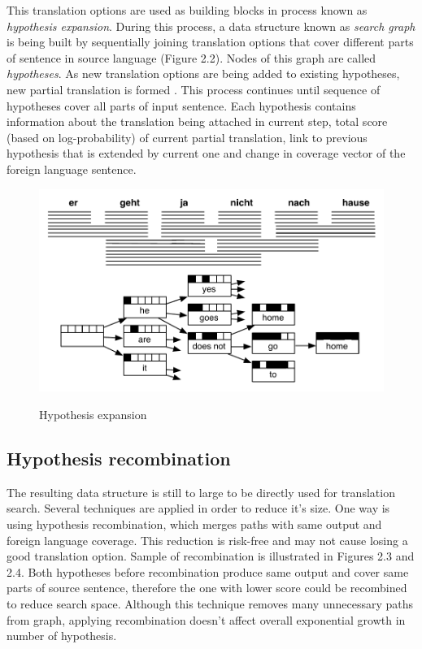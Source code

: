This translation options are used as building blocks in process known as \textit{hypothesis expansion}. During this process, a data structure known as \textit{search graph} is being built by sequentially joining translation options that cover different parts of sentence in source language (Figure 2.2). Nodes of this graph are called \textit{hypotheses}. As new translation options are being added to existing hypotheses, new partial translation is formed \cite{Koehn2009a}. This process continues until sequence of hypotheses cover all parts of input sentence. Each hypothesis contains information about the translation being attached in current step, total score (based on log-probability) of current partial translation, link to previous hypothesis that is extended by current one and change in coverage vector of the foreign language sentence.


\begin{figure}
 \centering 
 \includegraphics{g/decoding-step5.pdf}
 \caption{Hypothesis expansion}
 \caption*{\textit{\cite{Koehn2009a}}}
\end{figure}

\subsection{Hypothesis recombination}

The resulting data structure is still to large to be directly used for translation search. Several techniques are applied in order to reduce it's size. One way is using hypothesis recombination, which merges paths with same output and foreign language coverage. This reduction is risk-free and may not cause losing a good translation option. Sample of recombination is illustrated in Figures 2.3 and 2.4. Both hypotheses before recombination produce same output and cover same parts of source sentence, therefore the one with lower score could be recombined to reduce search space. Although this technique removes many unnecessary paths from graph, applying recombination doesn't affect overall exponential growth in number of hypothesis. 

